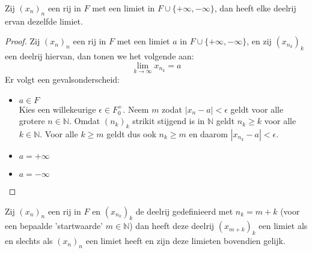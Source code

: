 \documentclass[main.tex]{subfiles}
\begin{document}
\begin{pr}
  \label{pr:deelrij-zelfde-limiet-als-limiet-bestaat}
  Zij $(x_{n})_{n}$ een rij in $F$ met een limiet in $F\cup\{+\infty,-\infty\}$, dan heeft elke deelrij ervan dezelfde limiet.

  \begin{proof}
    Zij $(x_{n})_{n}$ een rij in $F$ met een limiet $a$ in $F\cup\{+\infty,-\infty\}$, en zij $(x_{n_{k}})_{k}$ een deelrij hiervan, dan tonen we het volgende aan:
    \[ \lim_{k\rightarrow \infty}x_{n_{k}} = a \]
    Er volgt een gevalsonderscheid:
    \begin{itemize}
    \item $a\in F$\\
      Kies een willekeurige $\epsilon \in F_{0}^{+}$.
      Neem $m$ zodat $|x_{n}-a| < \epsilon$ geldt voor alle grotere $n\in \mathbb{N}$.
      Omdat $(n_{k})_{k}$ strikit stijgend is in $\mathbb{N}$ geldt $n_{k} \ge k$ voor alle $k\in \mathbb{N}$.
      Voor alle $k \ge m$ geldt dus ook $n_{k} \ge m$ en daarom $|x_{n_{k}}-a| < \epsilon$.
    \item $a = +\infty$
    \item $a = -\infty$
    \end{itemize}
  \end{proof}
\end{pr}

\begin{pr}
  Zij $(x_{n})_{n}$ een rij in $F$ en $(x_{n_{k}})_{k}$ de deelrij gedefinieerd met $n_{k} = m+k$ (voor een bepaalde 'startwaarde' $m\in\mathbb{N}$) dan heeft deze deelrij $(x_{m+k})_{k}$ een limiet als en slechts als $(x_{n})_{n}$ een limiet heeft en zijn deze limieten bovendien gelijk.
\end{pr}
\end{document}
